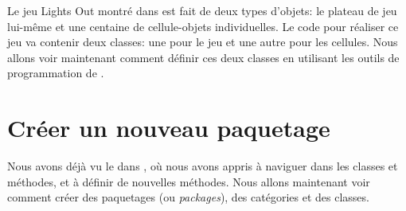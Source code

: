 \documentclass[a4paper,10pt,twoside]{book}
\begin{document}
Le jeu Lights Out montré dans  est fait de deux types d'objets: le plateau de jeu lui-même et une centaine de cellule-objets individuelles. Le code \pharo pour réaliser ce jeu va contenir deux classes: une pour le jeu et une autre pour les cellules.
Nous allons voir maintenant comment définir ces deux classes en utilisant les outils de programmation de \pharo.

\section{Créer un nouveau paquetage}

Nous avons déjà vu le 
dans , où nous avons appris à naviguer dans les classes
et méthodes, et à définir de nouvelles méthodes.
Nous allons maintenant voir comment créer des paquetages (ou \emph{packages}), des catégories et des classes.

\end{document}
